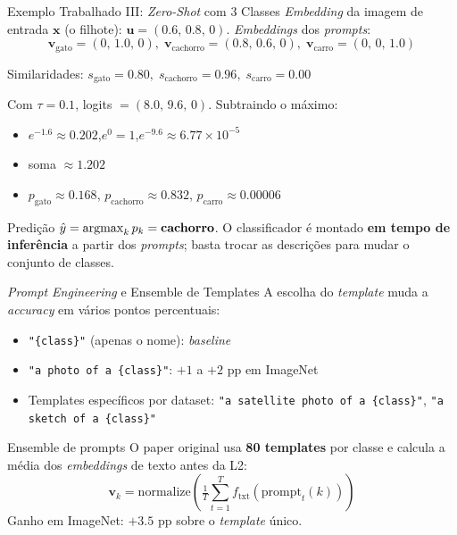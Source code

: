 \documentclass[aspectratio=169,xcolor=dvipsnames]{beamer}
\begin{document}
  \begin{frame}{Exemplo Trabalhado III: \textit{Zero-Shot} com 3 Classes}
    \textit{Embedding} da imagem de entrada $\mathbf{x}$ (o filhote): $\mathbf{u} = (0.6,\, 0.8,\, 0)$. \textit{Embeddings} dos \textit{prompts}:
    \[
      \mathbf{v}_{\text{gato}}     = (0,\, 1.0,\, 0),\;
      \mathbf{v}_{\text{cachorro}} = (0.8,\, 0.6,\, 0),\;
      \mathbf{v}_{\text{carro}}    = (0,\, 0,\, 1.0)
    \]

    Similaridades: $s_{\text{gato}} = 0.80,\; s_{\text{cachorro}} = 0.96,\; s_{\text{carro}} = 0.00$

    \vspace{0.4em}
    Com $\tau = 0.1$, logits $= (8.0,\, 9.6,\, 0)$. Subtraindo o máximo:
    \begin{itemize}\setlength{\itemsep}{0pt}
      \item $e^{-1.6} \approx 0.202$,\quad $e^{0} = 1$,\quad $e^{-9.6} \approx 6.77\!\times\!10^{-5}$
      \item soma $\approx 1.202$
      \item $p_{\text{gato}} \approx 0.168$,\; $p_{\text{cachorro}} \approx 0.832$,\; $p_{\text{carro}} \approx 0.00006$
    \end{itemize}

    \vspace{0.3em}
    \begin{block}{Predição}
      $\hat{y} = \operatorname*{argmax}_k p_k = \text{\textbf{cachorro}}$.
      O classificador é montado \textbf{em tempo de inferência} a partir dos \textit{prompts};
      basta trocar as descrições para mudar o conjunto de classes.
    \end{block}
  \end{frame}

  \begin{frame}{\textit{Prompt Engineering} e Ensemble de Templates}
    A escolha do \textit{template} muda a \textit{accuracy} em vários pontos percentuais:
    \begin{itemize}\setlength{\itemsep}{0pt}
      \item \texttt{"\{class\}"} (apenas o nome): \textit{baseline}
      \item \texttt{"a photo of a \{class\}"}: $+1$ a $+2$ pp em ImageNet
      \item Templates específicos por dataset: \texttt{"a satellite photo of a \{class\}"}, \texttt{"a sketch of a \{class\}"}
    \end{itemize}

    \vspace{0.4em}
    \begin{block}{Ensemble de prompts}
      O paper original usa \textbf{80 templates} por classe e calcula a média dos
      \textit{embeddings} de texto antes da L2:
      \[
        \mathbf{v}_k = \mathrm{normalize}\!\left( \tfrac{1}{T} \sum_{t=1}^{T} f_{\text{txt}}(\text{prompt}_t(k)) \right)
      \]
      Ganho em ImageNet: $+3.5$ pp sobre o \textit{template} único.
    \end{block}
  \end{frame}
\end{document}
